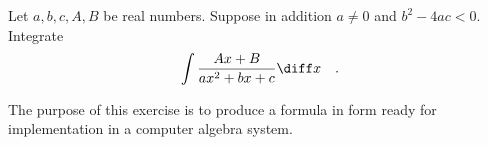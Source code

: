 \label{problemIntegrateBuildingBlockIIaandIIIa} Let $a,b,c,A, B$ be real numbers. Suppose in addition $a\neq 0$ and  $b^2-4ac<0$. Integrate
\[
\int \frac{Ax +B}{ax^2+bx+c}\diff x\quad .
\]

The purpose of this exercise is to produce a formula in form ready for implementation in a computer algebra system.

